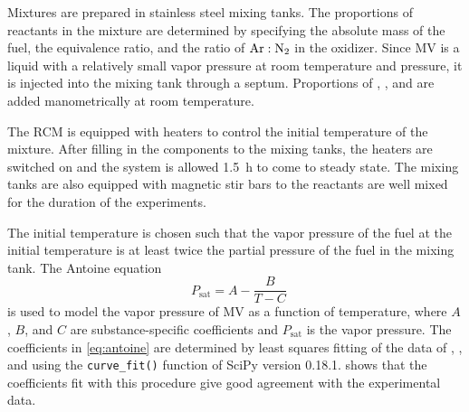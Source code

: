 \documentclass[12pt]{../ussci}
\newcommand*{\logten}{\mathop{\log_{10}}}
\begin{document}
Mixtures are prepared in stainless steel mixing tanks. The proportions of
reactants in the mixture are determined by specifying the absolute mass of the
fuel, the equivalence ratio, and the ratio of \(\ce{Ar}:\ce{N2}\) in the
oxidizer. Since MV is a liquid with a relatively small vapor pressure at room
temperature and pressure, it is injected into the mixing tank through a septum.
Proportions of , , and  are added manometrically at room
temperature.

The RCM is equipped with heaters to control the initial temperature of the
mixture. After filling in the components to the mixing tanks, the heaters are
switched on and the system is allowed \SI{1.5}{\hour} to come to steady state.
The mixing tanks are also equipped with magnetic stir bars to the reactants are
well mixed for the duration of the experiments.

The initial temperature is chosen such that the vapor pressure of the fuel at
the initial temperature is at least twice the partial pressure of the fuel in
the mixing tank. The Antoine equation
%
\begin{equation}\label{eq:antoine}
    \logten{P_{\text{sat}}} = A - \frac{B}{T - C}
\end{equation}
%
is used to model the vapor pressure of MV as a function of temperature, where
\(A\), \(B\), and \(C\) are substance-specific coefficients and
\(P_{\text{sat}}\) is the vapor pressure. The coefficients in \cref{eq:antoine}
are determined by least squares fitting of the data of \textcite{Ortega2003},
\textcite{vanGenderen2002}, and \textcite{Verevkin2008} using the
\verb|curve_fit()| function of SciPy \autocite{Jones2001} version 0.18.1.
 shows that the coefficients fit with this procedure
give good agreement with the experimental data.

\end{document}
